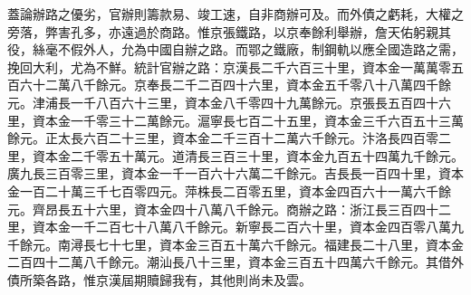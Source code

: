 \begin{pinyinscope}
蓋論辦路之優劣，官辦則籌款易、竣工速，自非商辦可及。而外債之虧耗，大權之旁落，弊害孔多，亦遠過於商路。惟京張鐵路，以京奉餘利舉辦，詹天佑躬親其役，絲毫不假外人，允為中國自辦之路。而鄂之鐵廠，制鋼軌以應全國造路之需，挽回大利，尤為不鮮。統計官辦之路：京漢長二千六百三十里，資本金一萬萬零五百六十二萬八千餘元。京奉長二千二百四十六里，資本金五千零八十八萬四千餘元。津浦長一千八百六十三里，資本金八千零四十九萬餘元。京張長五百四十六里，資本金一千零三十二萬餘元。滬寧長七百二十五里，資本金三千六百五十三萬餘元。正太長六百二十三里，資本金二千三百十二萬六千餘元。汴洛長四百零二里，資本金二千零五十萬元。道清長三百三十里，資本金九百五十四萬九千餘元。廣九長三百零三里，資本金一千一百六十六萬二千餘元。吉長長一百四十里，資本金一百二十萬三千七百零四元。萍株長二百零五里，資本金四百六十一萬六千餘元。齊昂長五十六里，資本金四十八萬八千餘元。商辦之路：浙江長三百四十二里，資本金一千二百七十八萬八千餘元。新寧長二百六十里，資本金四百零八萬九千餘元。南潯長七十七里，資本金三百五十萬六千餘元。福建長二十八里，資本金二百四十二萬八千餘元。潮汕長八十三里，資本金三百五十四萬六千餘元。其借外債所築各路，惟京漢屆期贖歸我有，其他則尚未及雲。


\end{pinyinscope}